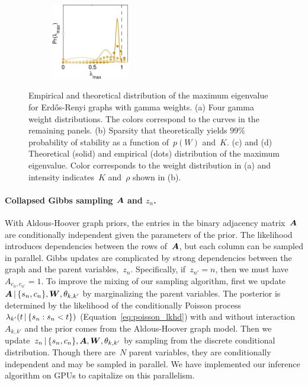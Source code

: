 \begin{figure}[!ht]
\begin{center}
\begin{subfigure}[b]{.22\textwidth}
\includegraphics[height=1.3in]{figures/ch2/stability_8_12} 
\end{subfigure}
\end{center}
\vspace{-1em}
\caption{Empirical and theoretical distribution of the maximum eigenvalue for Erd\H{o}s-Renyi graphs with gamma weights. (a) Four gamma weight distributions. The colors correspond to the curves in the remaining panels. (b) Sparsity that theoretically yields ${99\%}$ probability of stability as a function of~${p(W)}$ and~$K$. (c) and (d) Theoretical (solid) and empirical (dots) distribution of the maximum eigenvalue. Color corresponds to the weight distribution in (a) and intensity indicates~$K$ and~$\rho$ shown in (b).}
\label{fig:stability}
\vspace{-1em}
\end{figure}

\paragraph{Collapsed Gibbs sampling $\boldsymbol{A}$ and $z_n$.}
With Aldous-Hoover graph priors, the entries in the binary adjacency matrix~$\boldsymbol{A}$ are conditionally independent given the parameters of the prior. The likelihood introduces dependencies between the rows of~$\boldsymbol{A}$, but each column can be sampled in parallel. Gibbs updates are complicated by strong dependencies between the graph and the parent variables,~$z_n$. Specifically, if~${z_{n'}=n}$, then we must have~${A_{c_{n},c_{n'}}=1}$. To improve the mixing of our sampling algorithm, first we update~${\boldsymbol{A}\,|\,\{s_n,c_n\},\boldsymbol{W},\theta_{k,k'}}$ by marginalizing the parent variables. The posterior is determined by the likelihood of the conditionally Poisson process~${\lambda_{k'}(t\,|\,\{s_n:s_n<t\})}$ (Equation~\ref{eq:poisson_lkhd}) with and without interaction~${A_{k,k'}}$ and the prior comes from the Aldous-Hoover graph model. Then we update~${z_n\,|\,\{s_n,c_n\},\boldsymbol{A},\boldsymbol{W},\theta_{k,k'}}$ by sampling from the discrete conditional distribution. Though there are~$N$ parent variables, they are conditionally independent and may be sampled in parallel. We have implemented our inference algorithm on GPUs to capitalize on this parallelism.

